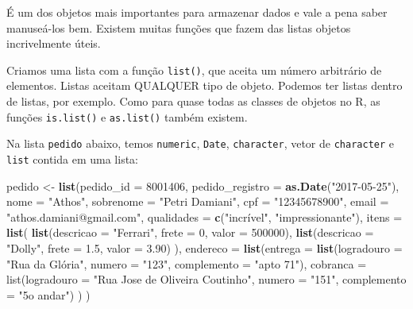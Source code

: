 \documentclass[
]{book}
\newenvironment{Shaded}{\begin{snugshade}}{\end{snugshade}}
\newcommand{\DataTypeTok}[1]{\textcolor[rgb]{0.13,0.29,0.53}{#1}}
\newcommand{\DecValTok}[1]{\textcolor[rgb]{0.00,0.00,0.81}{#1}}
\newcommand{\FloatTok}[1]{\textcolor[rgb]{0.00,0.00,0.81}{#1}}
\newcommand{\KeywordTok}[1]{\textcolor[rgb]{0.13,0.29,0.53}{\textbf{#1}}}
\newcommand{\NormalTok}[1]{#1}
\newcommand{\StringTok}[1]{\textcolor[rgb]{0.31,0.60,0.02}{#1}}
\begin{document}
É um dos objetos mais importantes para armazenar dados e vale a pena saber manuseá-los bem. Existem muitas funções que fazem das listas objetos incrivelmente úteis.

Criamos uma lista com a função \texttt{list()}, que aceita um número arbitrário de elementos. Listas aceitam QUALQUER tipo de objeto. Podemos ter listas dentro de listas, por exemplo. Como para quase todas as classes de objetos no R, as funções \texttt{is.list()} e \texttt{as.list()} também existem.

Na lista \texttt{pedido} abaixo, temos \texttt{numeric}, \texttt{Date}, \texttt{character}, vetor de \texttt{character} e \texttt{list} contida em uma lista:

\begin{Shaded}
\begin{Highlighting}[]
\NormalTok{pedido <-}\StringTok{ }\KeywordTok{list}\NormalTok{(}\DataTypeTok{pedido_id =} \DecValTok{8001406}\NormalTok{,}
               \DataTypeTok{pedido_registro =} \KeywordTok{as.Date}\NormalTok{(}\StringTok{"2017-05-25"}\NormalTok{),}
               \DataTypeTok{nome =} \StringTok{"Athos"}\NormalTok{, }
               \DataTypeTok{sobrenome =} \StringTok{"Petri Damiani"}\NormalTok{, }
               \DataTypeTok{cpf =} \StringTok{"12345678900"}\NormalTok{, }
               \DataTypeTok{email =} \StringTok{"athos.damiani@gmail.com"}\NormalTok{, }
               \DataTypeTok{qualidades =} \KeywordTok{c}\NormalTok{(}\StringTok{"incrível"}\NormalTok{, }\StringTok{"impressionante"}\NormalTok{),}
               \DataTypeTok{itens =} \KeywordTok{list}\NormalTok{(}
                 \KeywordTok{list}\NormalTok{(}\DataTypeTok{descricao =} \StringTok{"Ferrari"}\NormalTok{, }
                      \DataTypeTok{frete =} \DecValTok{0}\NormalTok{, }
                      \DataTypeTok{valor =} \DecValTok{500000}\NormalTok{),}
                 \KeywordTok{list}\NormalTok{(}\DataTypeTok{descricao =} \StringTok{"Dolly"}\NormalTok{, }
                      \DataTypeTok{frete =} \FloatTok{1.5}\NormalTok{, }
                      \DataTypeTok{valor =} \FloatTok{3.90}\NormalTok{)}
\NormalTok{               ), }
               \DataTypeTok{endereco =} \KeywordTok{list}\NormalTok{(}\DataTypeTok{entrega =} \KeywordTok{list}\NormalTok{(}\DataTypeTok{logradouro =} \StringTok{"Rua da Glória", }
\StringTok{                                              numero = "}\DecValTok{123}\StringTok{",}
\StringTok{                                              complemento = "}\NormalTok{apto }\DecValTok{71}\StringTok{"),}
\StringTok{                               cobranca = list(logradouro = "}\NormalTok{Rua Jose de Oliveira Coutinho}\StringTok{",}
\StringTok{                                               numero = "}\DecValTok{151}\StringTok{",}
\StringTok{                                               complemento = "}\NormalTok{5o andar}\StringTok{")}
\StringTok{               )}
\StringTok{)}
\end{Highlighting}
\end{Shaded}
\end{document}
